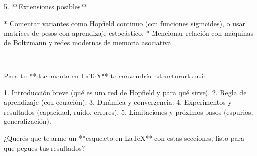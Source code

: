 \documentclass[11pt]{article} %
\begin{document}
5. **Extensiones posibles**

   * Comentar variantes como Hopfield continuo (con funciones sigmoides), o usar matrices de pesos con aprendizaje estocástico.
   * Mencionar relación con máquinas de Boltzmann y redes modernas de memoria asociativa.

---

Para tu **documento en LaTeX** te convendría estructurarlo así:

1. Introducción breve (qué es una red de Hopfield y para qué sirve).
2. Regla de aprendizaje (con ecuación).
3. Dinámica y convergencia.
4. Experimentos y resultados (capacidad, ruido, errores).
5. Limitaciones y próximos pasos (espurios, generalización).

¿Querés que te arme un **esqueleto en LaTeX** con estas secciones, listo para que pegues tus resultados?
\end{document}
